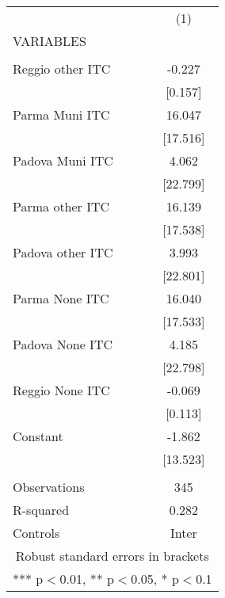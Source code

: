 \begin{tabular}{lc} \hline
 & (1) \\
VARIABLES &  \\ \hline
 &  \\
Reggio other ITC & -0.227 \\
 & [0.157] \\
Parma Muni ITC & 16.047 \\
 & [17.516] \\
Padova Muni ITC & 4.062 \\
 & [22.799] \\
Parma other ITC & 16.139 \\
 & [17.538] \\
Padova other ITC & 3.993 \\
 & [22.801] \\
Parma None ITC & 16.040 \\
 & [17.533] \\
Padova None ITC & 4.185 \\
 & [22.798] \\
Reggio None ITC & -0.069 \\
 & [0.113] \\
Constant & -1.862 \\
 & [13.523] \\
 &  \\
Observations & 345 \\
R-squared & 0.282 \\
 Controls & Inter \\ \hline
\multicolumn{2}{c}{ Robust standard errors in brackets} \\
\multicolumn{2}{c}{ *** p$<$0.01, ** p$<$0.05, * p$<$0.1} \\
\end{tabular}

